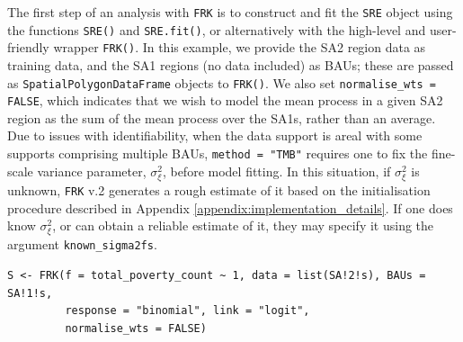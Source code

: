 \documentclass[12pt,a4paper]{article}
\begin{document}
The first step of an analysis with \texttt{FRK} is to construct and fit the \texttt{SRE} object using the functions \texttt{SRE()} and \texttt{SRE.fit()}, or alternatively with the high-level and user-friendly wrapper \texttt{FRK()}. 
In this example, we provide the SA2 region data as training data, and the SA1 regions (no data included) as BAUs; these are passed as \texttt{SpatialPolygonDataFrame} objects to \texttt{FRK()}. 
We also set \texttt{normalise\_wts = FALSE}, which indicates that we wish to model the mean process in a given SA2 region as the sum of the mean process over the SA1s, rather than an average.
Due to issues with identifiability, when the data support is areal with some supports comprising multiple BAUs,  \texttt{method = "TMB"} requires one to fix the fine-scale variance parameter, $\sigma^2_\xi$, before model fitting. 
In this situation, if $\sigma^2_\xi$ is unknown, \texttt{FRK} v.2 generates a rough estimate of it based on the initialisation procedure described in Appendix \ref{appendix:implementation_details}. 
If one does know $\sigma^2_\xi$, or can obtain a reliable estimate of it, they may specify it using the argument \texttt{known\_sigma2fs}.

\begin{minipage}{\linewidth}
\begin{lstlisting}[style=R]
S <- FRK(f = total_poverty_count ~ 1, data = list(SA!2!s), BAUs = SA!1!s, 
         response = "binomial", link = "logit", 
         normalise_wts = FALSE)
\end{lstlisting}
\end{minipage}
\end{document}
